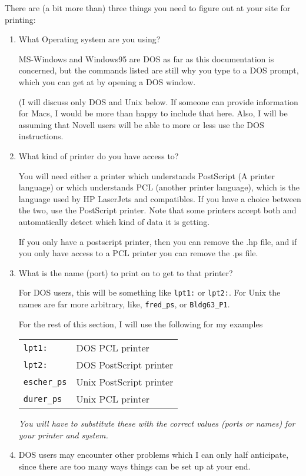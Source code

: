 \documentclass[%
	11pt,
        a4paper,
        twoside]{workrep}
\newcommand*{\file}[1]{\texttt{#1}}		%
\begin{document}
There are (a bit more than) three things you need to figure out
at your site for printing:
\begin{enumerate}

\item    What Operating system are you using?

         MS-Windows and Windows95 are DOS as far as this documentation
	 is concerned, but the commands listed are still why you type
	 to a DOS prompt, which you can get at by opening a DOS window.

         (I will discuss only
	 DOS and Unix below.  If someone can provide information for
	 Macs, I would be more than happy to include that here.  Also,
	 I will be assuming that Novell users will be able to more
	 or less use the DOS instructions.


\item    What kind of printer do you have access to?

         You will need either a printer
	 which understands PostScript (A printer language) or
	 which understands PCL (another printer language), which
	 is the language used by HP LaserJets and compatibles.  If
	 you have a choice between the two, use the PostScript printer.
	 Note that some printers accept both and automatically detect
	 which kind of data it is getting.

         If you only have a postscript printer, then you can remove
         the .hp file, and if you only have access to a PCL printer
	 you can remove the .ps file.

\item\label{en:print:name}
         What is the name (port) to print on to get to that printer?

	 For DOS users, this will be something like \file{lpt1:} or
	 \file{lpt2:}.  For Unix the names are far more arbitrary,
	 like, \file{fred\_ps}, or \file{Bldg63\_P1}.

         For the rest of this section,
         I will use the following for my examples
	 \begin{center}
	 \begin{tabular}{ll}
	   \file{lpt1:} & DOS PCL printer\\
	   \file{lpt2:} & DOS PostScript printer\\
	   \file{escher\_ps} & Unix PostScript printer\\
	   \file{durer\_ps} & Unix PCL printer
	 \end{tabular}
	 \end{center}
	 \emph{You will have to substitute
	 these with the correct values (ports or names)
         for your printer and system.}

\item	 DOS users may encounter other problems which I can only
	 half anticipate, since there are too many ways things can
	 be set up at your end.
\end{enumerate}
\end{document}
